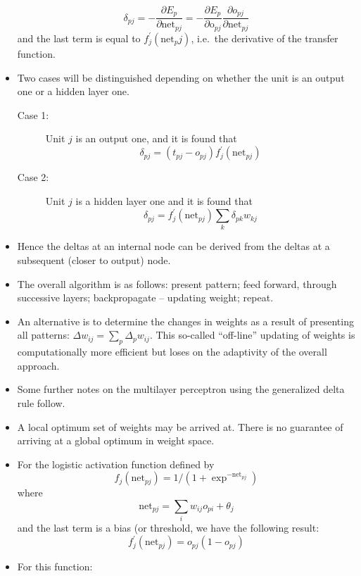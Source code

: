 \documentclass[a4,dvips]{seminar}
\begin{document}
\begin{slide}
\begin{itemize}
$$ \delta_{pj} = - \frac{\partial E_p}{\partial \mbox{net}_{pj}} = 
- \frac{\partial E_p}{\partial \mbox{o}_{pj}} \frac{\partial o_{pj}}
{\partial \mbox{net}_{pj}} $$
and the last term is equal to $f^\prime_j(\mbox{net}_pj) $, i.e.\ the
derivative of the transfer function.  
\item Two cases will be distinguished 
depending on whether the unit is an output one or a hidden layer one.

\begin{description}
\item[Case 1:] Unit $j$ is an output one, and it is found that 
$$\delta_{pj}= (t_{pj}- o_{pj}) f^\prime_j(\mbox{net}_{pj}) $$

\item[Case 2:] Unit $j$ is a hidden layer one and it is found that
$$ \delta_{pj} = f^\prime_j(\mbox{net}_{pj}) \sum_k \delta_{pk} w_{kj} $$
\end{description}

\item Hence the deltas at an internal node can be derived from the deltas at a
subsequent (closer to output) node.  

\item The overall algorithm is as follows: present pattern; feed forward, 
through successive layers; backpropagate -- updating weight; repeat.

\item An alternative is to determine the changes in weights as a result of 
presenting all patterns: $\Delta w_{ij} = \sum_p \Delta_p w_{ij}$.  This
so-called ``off-line'' updating of weights is computationally more 
efficient but loses on the adaptivity of the overall approach. 

\item Some further notes on the multilayer perceptron using the generalized 
delta rule follow. 

\item A local optimum set of weights may be arrived at.  There is no guarantee
of arriving at a global optimum in weight space.   

\item For the logistic activation function defined by
$$ f_j(\mbox{net}_{pj}) = 1/(1 + \exp^{-\mbox{net}_{pj}}) $$
where
$$\mbox{net}_{pj} = \sum_i w_{ij} o_{pi} + \theta_j $$
and the last term is a bias (or threshold, we have the following result:
$$f^\prime_j(\mbox{net}_{pj}) = o_{pj}(1 - o_{pj}) $$

\item For this function: 


\end{itemize}
\end{slide}
\end{document}
